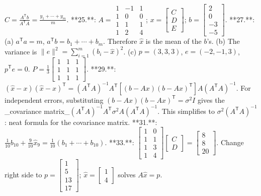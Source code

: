 \(C=\frac{A^{\mathsf{T}}b}{A^{\mathsf{T}}A}=\frac{y_{1}+\cdots+y_{m}}{m}\).
**25.**: \(A=\begin{smallmatrix}1&-1&1\\ 1&0&0\\ 1&1&1\\ 1&2&4\end{smallmatrix}\); \(x=\begin{bmatrix}C\\ D\\ E\end{bmatrix}\); \(b=\begin{bmatrix}2\\ 0\\ -3\\ -5\end{bmatrix}\).
**27.**: (a) \(a^{\mathsf{T}}a=m\), \(a^{\mathsf{T}}b=b_{1}+\cdots+b_{m}\). Therefore \(\widehat{x}\) is the mean of the \(b\)'s. (b) The variance is \(\|e\|^{2}=\sum_{i=1}^{m}(b_{i}-\widehat{x})^{2}\). (c) \(p=(3,3,3)\), \(e=(-2,-1,3)\), \(p^{\mathsf{T}}e=0\). \(P=\frac{1}{3}\begin{bmatrix}1&1&1\\ 1&1&1\\ 1&1&1\end{bmatrix}\).
**29.**: \((\widehat{x}-x)(\widehat{x}-x)^{\mathsf{T}}=(A^{\mathsf{T}}A)^{-1}A^{\mathsf{ T}}[(b-Ax)(b-Ax)^{\mathsf{T}}]A(A^{\mathsf{T}}A)^{-1}\). For independent errors, substituting \((b-Ax)(b-Ax)^{\mathsf{T}}=\sigma^{2}I\) gives the _covariance matrix_\((A^{\mathsf{T}}A)^{-1}A^{\mathsf{T}}\sigma^{2}A(A^{\mathsf{T}}A)^{-1}\). This simplifies to \(\sigma^{2}(A^{\mathsf{T}}A)^{-1}\): neat formula for the covariance matrix.
**31.**: \(\frac{1}{10}b_{10}+\frac{9}{10}\widehat{x}_{9}=\frac{1}{10}(b_{1}+\cdots+b_{1 0})\).
**33.**: \(\begin{bmatrix}1&0\\ 1&1\\ 1&3\\ 1&4\end{bmatrix}\begin{bmatrix}C\\ D\end{bmatrix}=\begin{bmatrix}8\\ 8\\ 20\end{bmatrix}\). Change right side to \(p=\begin{bmatrix}1\\ 5\\ 13\\ 17\end{bmatrix}\); \(\widehat{x}=\begin{bmatrix}1\\ 4\end{bmatrix}\) solves \(A\widehat{x}=p\).

